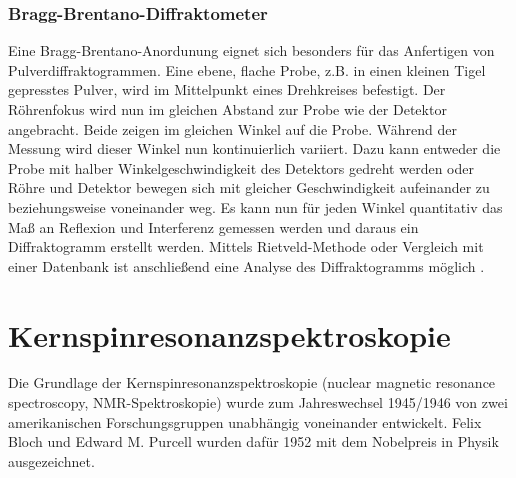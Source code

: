 \documentclass[a4paper, 11pt, headsepline,footsepline,twoside,abstract]{scrbook}
\begin{document}
\subsubsection{Bragg-Brentano-Diffraktometer}
Eine Bragg-Brentano-Anordunung eignet sich besonders für das Anfertigen von Pulverdiffraktogrammen. Eine ebene, flache Probe, z.B. in einen kleinen Tigel gepresstes Pulver, wird im Mittelpunkt eines Drehkreises befestigt. Der Röhrenfokus wird nun im gleichen Abstand zur Probe wie der Detektor angebracht. Beide zeigen im gleichen Winkel auf die Probe. Während der Messung wird dieser Winkel nun kontinuierlich variiert. Dazu kann entweder die Probe mit halber Winkelgeschwindigkeit des Detektors gedreht werden oder Röhre und Detektor bewegen sich mit gleicher Geschwindigkeit aufeinander zu beziehungsweise voneinander weg. Es kann nun für jeden Winkel quantitativ das Maß an Reflexion und Interferenz gemessen werden und daraus ein Diffraktogramm erstellt werden. Mittels Rietveld-Methode oder Vergleich mit einer Datenbank ist anschließend eine Analyse des Diffraktogramms möglich \cite{krischner1994}.
\section{Kernspinresonanzspektroskopie}
Die Grundlage der Kernspinresonanzspektroskopie (nuclear magnetic resonance spectroscopy, NMR-Spektroskopie) wurde zum Jahreswechsel 1945/1946 von zwei amerikanischen Forschungsgruppen unabhängig voneinander entwickelt. Felix Bloch und Edward M. Purcell wurden dafür 1952 mit dem Nobelpreis in Physik ausgezeichnet.
\end{document}
